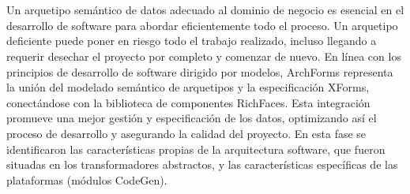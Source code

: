 \documentclass[12pt,a4paper]{article}
\begin{document}
\\\\
Un arquetipo semántico de datos adecuado al dominio de negocio es esencial en el desarrollo de software para abordar eficientemente todo el proceso. Un arquetipo deficiente puede poner en riesgo todo el trabajo realizado, incluso llegando a requerir desechar el proyecto por completo y comenzar de nuevo. En línea con los principios de desarrollo de software dirigido por modelos, ArchForms representa la unión del modelado semántico de arquetipos y la especificación XForms, conectándose con la biblioteca de componentes RichFaces. Esta integración promueve una mejor gestión y especificación de los datos, optimizando así el proceso de desarrollo y asegurando la calidad del proyecto. En esta fase se identificaron las características propias de la arquitectura software, que fueron situadas en los transformadores abstractos, y las características específicas de las plataformas (módulos CodeGen). 

\end{document}
